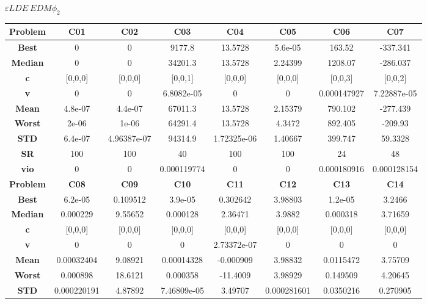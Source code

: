\documentclass{IEEEtran}
\begin{document}
\begin{center}
$\varepsilon LDE\ EDM \phi_2$\\
  \begin{tabular}{|c|c|c|c|c|c|c|c|}
    \hline 
    \textbf{Problem} & \textbf{C01} & \textbf{C02} & \textbf{C03} & \textbf{C04} & \textbf{C05} & \textbf{C06} & \textbf{C07} \\ 
    \hline\hline 
    \textbf{Best} & 0 & 0 & 9177.8 & 13.5728 & 5.6e-05 & 163.52 & -337.341\\ 
    \textbf{Median} & 0 & 0 & 34201.3 & 13.5728 & 2.24399 & 1208.07 & -286.037\\ 
    \textbf{c} & [0,0,0] & [0,0,0] & [0,0,1] & [0,0,0] & [0,0,0] & [0,0,3] & [0,0,2]\\ 
    \textbf{v} & 0 & 0 & 6.8082e-05 & 0 & 0 & 0.000147927 & 7.22887e-05\\ 
    \textbf{Mean} & 4.8e-07 & 4.4e-07 & 67011.3 & 13.5728 & 2.15379 & 790.102 & -277.439\\ 
    \textbf{Worst} & 2e-06 & 1e-06 & 64291.4 & 13.5728 & 4.3472 & 892.405 & -209.93\\ 
    \textbf{STD} & 6.4e-07 & 4.96387e-07 & 94314.9 & 1.72325e-06 & 1.40667 & 399.747 & 59.3328\\ 
    \textbf{SR} & 100 & 100 & 40 & 100 & 100 & 24 & 48\\ 
    \textbf{vio} & 0 & 0 & 0.000119774 & 0 & 0 & 0.000180916 & 0.000128154\\ 
    \hline 
    \hline 
    \textbf{Problem} & \textbf{C08} & \textbf{C09} & \textbf{C10} & \textbf{C11} & \textbf{C12} & \textbf{C13} & \textbf{C14} \\ 
    \hline\hline 
    \textbf{Best} & 6.2e-05 & 0.109512 & 3.9e-05 & 0.302642 & 3.98803 & 1.2e-05 & 3.2466\\ 
    \textbf{Median} & 0.000229 & 9.55652 & 0.000128 & 2.36471 & 3.9882 & 0.000318 & 3.71659\\ 
    \textbf{c} & [0,0,0] & [0,0,0] & [0,0,0] & [0,0,0] & [0,0,0] & [0,0,0] & [0,0,0]\\ 
    \textbf{v} & 0 & 0 & 0 & 2.73372e-07 & 0 & 0 & 0\\ 
    \textbf{Mean} & 0.00032404 & 9.08921 & 0.00014328 & -0.000909 & 3.98832 & 0.0115472 & 3.75709\\ 
    \textbf{Worst} & 0.000898 & 18.6121 & 0.000358 & -11.4009 & 3.98929 & 0.149509 & 4.20645\\ 
    \textbf{STD} & 0.000220191 & 4.87892 & 7.46809e-05 & 3.49707 & 0.000281601 & 0.0350216 & 0.270905\\ 

\end{tabular}
\end{center}
\end{document}
